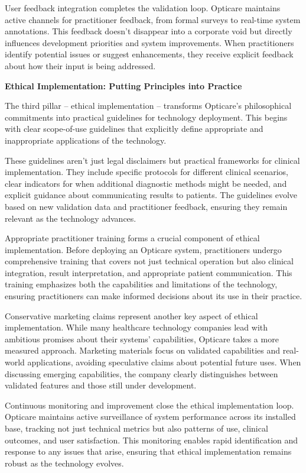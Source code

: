 \documentclass[
  Letterpaper,
]{scrbook}
\begin{document}
User feedback integration completes the validation loop. Opticare
maintains active channels for practitioner feedback, from formal surveys
to real-time system annotations. This feedback doesn't disappear into a
corporate void but directly influences development priorities and system
improvements. When practitioners identify potential issues or suggest
enhancements, they receive explicit feedback about how their input is
being addressed.

\textbf{Ethical Implementation: Putting Principles into Practice}

The third pillar -- ethical implementation -- transforms Opticare's
philosophical commitments into practical guidelines for technology
deployment. This begins with clear scope-of-use guidelines that
explicitly define appropriate and inappropriate applications of the
technology.

These guidelines aren't just legal disclaimers but practical frameworks
for clinical implementation. They include specific protocols for
different clinical scenarios, clear indicators for when additional
diagnostic methods might be needed, and explicit guidance about
communicating results to patients. The guidelines evolve based on new
validation data and practitioner feedback, ensuring they remain relevant
as the technology advances.

Appropriate practitioner training forms a crucial component of ethical
implementation. Before deploying an Opticare system, practitioners
undergo comprehensive training that covers not just technical operation
but also clinical integration, result interpretation, and appropriate
patient communication. This training emphasizes both the capabilities
and limitations of the technology, ensuring practitioners can make
informed decisions about its use in their practice.

Conservative marketing claims represent another key aspect of ethical
implementation. While many healthcare technology companies lead with
ambitious promises about their systems' capabilities, Opticare takes a
more measured approach. Marketing materials focus on validated
capabilities and real-world applications, avoiding speculative claims
about potential future uses. When discussing emerging capabilities, the
company clearly distinguishes between validated features and those still
under development.

Continuous monitoring and improvement close the ethical implementation
loop. Opticare maintains active surveillance of system performance
across its installed base, tracking not just technical metrics but also
patterns of use, clinical outcomes, and user satisfaction. This
monitoring enables rapid identification and response to any issues that
arise, ensuring that ethical implementation remains robust as the
technology evolves.
\end{document}
